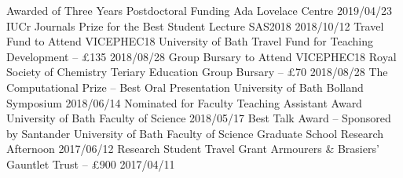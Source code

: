 \begin{cvpubs}
  \cvpub
    {Awarded of Three Years Postdoctoral Funding}
    {Ada Lovelace Centre}
    {2019/04/23}
  \cvpub
    {IUCr Journals Prize for the Best Student Lecture}
    {SAS2018}
    {2018/10/12}
  \cvpub
    {Travel Fund to Attend VICEPHEC18}
    {University of Bath Travel Fund for Teaching Development -- £135}
    {2018/08/28}
  \cvpub
    {Group Bursary to Attend VICEPHEC18}
    {Royal Society of Chemistry Teriary Education Group Bursary -- £70}
    {2018/08/28}
  \cvpub
    {The Computational Prize -- Best Oral Presentation}
    {University of Bath Bolland Symposium}
    {2018/06/14}
  \cvpub
    {Nominated for Faculty Teaching Assistant Award}
    {University of Bath Faculty of Science}
    {2018/05/17}
  \cvpub
    {Best Talk Award -- Sponsored by Santander}
    {University of Bath Faculty of Science Graduate School Research Afternoon}
    {2017/06/12}
  \cvpub
    {Research Student Travel Grant}
    {Armourers \& Brasiers' Gauntlet Trust -- £900}
    {2017/04/11}
\end{cvpubs}
